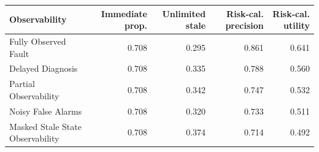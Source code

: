 \begin{tabular}{lrrrr}
\toprule
Observability & Immediate prop. & Unlimited stale & Risk-cal. precision & Risk-cal. utility \\
\midrule
Fully Observed Fault & 0.708 & 0.295 & 0.861 & 0.641 \\
Delayed Diagnosis & 0.708 & 0.335 & 0.788 & 0.560 \\
Partial Observability & 0.708 & 0.342 & 0.747 & 0.532 \\
Noisy False Alarms & 0.708 & 0.320 & 0.733 & 0.511 \\
Masked Stale State Observability & 0.708 & 0.374 & 0.714 & 0.492 \\
\bottomrule
\end{tabular}
